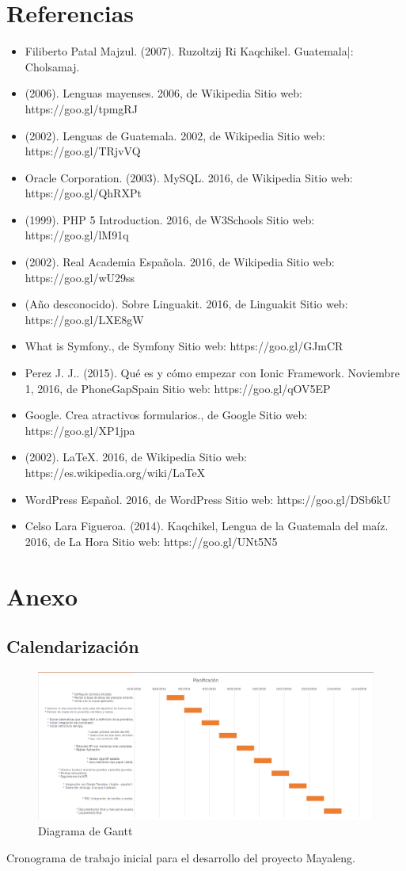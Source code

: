 \documentclass[a4paper,openright,11pt]{article}
\begin{document}
\section{Referencias}
\begin{itemize}
	\item Filiberto Patal Majzul. (2007). Ruzoltzij Ri Kaqchikel. Guatemala|: Cholsamaj.
	\item (2006). Lenguas mayenses. 2006, de Wikipedia Sitio web: https://goo.gl/tpmgRJ
	\item (2002). Lenguas de Guatemala. 2002, de Wikipedia Sitio web: https://goo.gl/TRjvVQ
	\item Oracle Corporation. (2003). MySQL. 2016, de Wikipedia Sitio web: https://goo.gl/QhRXPt
	\item (1999). PHP 5 Introduction. 2016, de W3Schools Sitio web: https://goo.gl/lM91q
	\item (2002). Real Academia Española. 2016, de Wikipedia Sitio web: https://goo.gl/wU29ss
	\item (Año desconocido). Sobre Linguakit. 2016, de Linguakit Sitio web: https://goo.gl/LXE8gW
	\item What is Symfony., de Symfony Sitio web: https://goo.gl/GJmCR
	\item Perez J. J.. (2015). Qué es y cómo empezar con Ionic Framework. Noviembre 1, 2016, de PhoneGapSpain Sitio web: https://goo.gl/qOV5EP
	\item Google. Crea atractivos formularios., de Google Sitio web: https://goo.gl/XP1jpa
	\item (2002). LaTeX. 2016, de Wikipedia Sitio web: https://es.wikipedia.org/wiki/LaTeX
	\item WordPress Español. 2016, de WordPress Sitio web: https://goo.gl/DSb6kU
	\item Celso Lara Figueroa. (2014). Kaqchikel, Lengua de la Guatemala del maíz. 2016, de La Hora Sitio web: https://goo.gl/UNt5N5
\end{itemize}
\newpage

\section{Anexo}
\subsection{Calendarización}
\begin{figure}[h]
  \centering
    \includegraphics[width=1.0\textwidth]{Gantt}
  \caption{Diagrama de Gantt}
  \label{fig:gantt}
\end{figure}
Cronograma de trabajo inicial para el desarrollo del proyecto Mayaleng.
\end{document}
